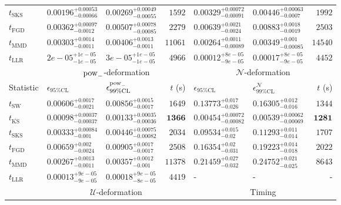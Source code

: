 \begin{tabular}{l|llr|llr}
	$t_{\mathrm{SKS}}$ & $0.00196_{-0.00066}^{+0.00053}$ & $0.00269_{-0.00055}^{+0.00049}$ & $1592$ & $0.00329_{-0.00091}^{+0.00072}$ & $0.00446_{-0.0007}^{+0.00063}$ & $1992$ \\
	$t_{\mathrm{FGD}}$ & $0.00362_{-0.0012}^{+0.00097}$ & $0.00507_{-0.00085}^{+0.00078}$ & $2279$ & $0.00639_{-0.0024}^{+0.0021}$ & $0.00883_{-0.0019}^{+0.0018}$ & $2503$ \\
	$t_{\mathrm{MMD}}$ & $0.00303_{-0.0011}^{+0.0014}$ & $0.00406_{-0.0011}^{+0.0013}$ & $11061$ & $0.00264_{-0.00089}^{+0.0011}$ & $0.00349_{-0.00085}^{+0.001}$ & $14540$ \\
	$t_{\mathrm{LLR}}$ & $2e-05_{-1e-05}^{+1e-05}$ & $3e-05_{-1e-05}^{+1e-05}$ & $4966$ & $0.00012_{-9e-05}^{+8e-05}$ & $0.00017_{-9e-05}^{+8e-05}$ & $4452$ \\
	\toprule
	\multicolumn{1}{c}{} & \multicolumn{3}{c}{$\rm{pow}_{-}$-deformation} & \multicolumn{3}{c}{$\mathcal{N}$-deformation} \\
	Statistic & $\epsilon_{95\%\mathrm{CL}}$ & $\epsilon^  {\rm{pow}_{-}}_{99\%\mathrm{CL}}$ & $t$ (s) & $\epsilon_{95\%\mathrm{CL}}$ & $\epsilon^    {\mathcal{N}}_{99\%\mathrm{CL}}$ & $t$ (s) \\
	\midrule
	$t_{\mathrm{SW}}$ & $0.00606_{-0.0021}^{+0.0017}$ & $0.00856_{-0.0017}^{+0.0015}$ & $1649$ & $0.13773_{-0.026}^{+0.017}$ & $0.16305_{-0.016}^{+0.012}$ & $1344$ \\
	$t_{\overline{\mathrm{KS}}}$ & ${\mathbf{0.00098_{-0.00037}^{+0.00037}}}$ & ${\mathbf{0.00133_{-0.00036}^{+0.00035}}}$ & ${\mathbf{1366}}$ & ${\mathbf{0.00454_{-0.00082}^{+0.00072}}}$ & ${\mathbf{0.00539_{-0.00069}^{+0.00062}}}$ & ${\mathbf{1281}}$ \\
	$t_{\mathrm{SKS}}$ & $0.00333_{-0.001}^{+0.00084}$ & $0.00446_{-0.00082}^{+0.00075}$ & $2034$ & $0.09534_{-0.02}^{+0.015}$ & $0.11293_{-0.014}^{+0.011}$ & $1707$ \\
	$t_{\mathrm{FGD}}$ & $0.00659_{-0.0024}^{+0.002}$ & $0.00905_{-0.0017}^{+0.0017}$ & $2508$ & $0.16354_{-0.031}^{+0.02}$ & $0.19223_{-0.018}^{+0.014}$ & $2022$ \\
	$t_{\mathrm{MMD}}$ & $0.00267_{-0.0011}^{+0.0013}$ & $0.00357_{-0.001}^{+0.0012}$ & $11378$ & $0.21459_{-0.032}^{+0.027}$ & $0.24752_{-0.025}^{+0.021}$ & $8643$ \\
	$t_{\mathrm{LLR}}$ & $0.00013_{-9e-05}^{+9e-05}$ & $0.00018_{-8e-05}^{+9e-05}$ & $4419$ & - & - & - \\
	\toprule
	\multicolumn{1}{c}{} & \multicolumn{3}{c}{$\mathcal{U}$-deformation} & \multicolumn{3}{c}{Timing} \\

\end{tabular}
